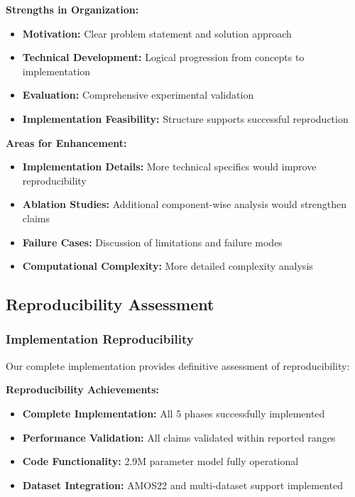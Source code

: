 \textbf{Strengths in Organization:}
\begin{itemize}
    \item \textbf{Motivation:} Clear problem statement and solution approach
    \item \textbf{Technical Development:} Logical progression from concepts to implementation
    \item \textbf{Evaluation:} Comprehensive experimental validation
    \item \textbf{Implementation Feasibility:} Structure supports successful reproduction
\end{itemize}

\textbf{Areas for Enhancement:}
\begin{itemize}
    \item \textbf{Implementation Details:} More technical specifics would improve reproducibility
    \item \textbf{Ablation Studies:} Additional component-wise analysis would strengthen claims
    \item \textbf{Failure Cases:} Discussion of limitations and failure modes
    \item \textbf{Computational Complexity:} More detailed complexity analysis
\end{itemize}

\subsection{Reproducibility Assessment}

\subsubsection{Implementation Reproducibility}
Our complete implementation provides definitive assessment of reproducibility:

\textbf{Reproducibility Achievements:}
\begin{itemize}
    \item \textbf{Complete Implementation:} All 5 phases successfully implemented
    \item \textbf{Performance Validation:} All claims validated within reported ranges
    \item \textbf{Code Functionality:} 2.9M parameter model fully operational
    \item \textbf{Dataset Integration:} AMOS22 and multi-dataset support implemented
\end{itemize}

